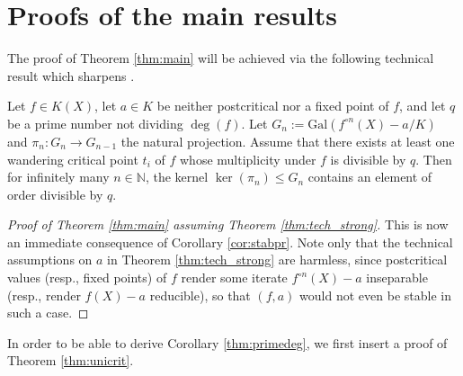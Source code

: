 \documentclass[a4paper]{amsart}
\begin{document}
 
   
  \section{Proofs of the main results}
  \label{sec:proofs}
 The proof of Theorem \ref{thm:main} will be achieved via the following technical result which sharpens \cite[Theorem 5]{Betal}.
  \begin{theorem}
 \label{thm:tech_strong}
 Let $f\in K(X)$, let $a\in K$ be neither postcritical nor a fixed point of $f$, and let $q$ be a prime number not dividing $\deg(f)$. Let  $G_n:=\mathrm{Gal}(f^{\circ n}(X)-a/K)$ and $\pi_n:G_n\to G_{n-1}$ the natural projection.  Assume that there exists at least one wandering critical point $t_i$ of $f$ whose multiplicity under $f$ is divisible by $q$. Then for infinitely many $n\in \mathbb{N}$, the kernel $\ker(\pi_n)\le G_n$ contains an element of order divisible by $q$.
 \end{theorem}
 
  
 \begin{proof}[Proof of Theorem \ref{thm:main} assuming Theorem \ref{thm:tech_strong}]
 This is now an immediate consequence of Corollary \ref{cor:stabpr}. Note only that the technical assumptions on $a$ in Theorem \ref{thm:tech_strong} are harmless, since postcritical values (resp., fixed points) of $f$ render some iterate $f^{\circ n}(X)-a$ inseparable (resp., render $f(X)-a$ reducible), so that $(f,a)$ would not even be stable in such a case.
 \end{proof}
  
In order to be able to derive Corollary \ref{thm:primedeg}, we first insert a proof of Theorem \ref{thm:unicrit}.
\end{document}
